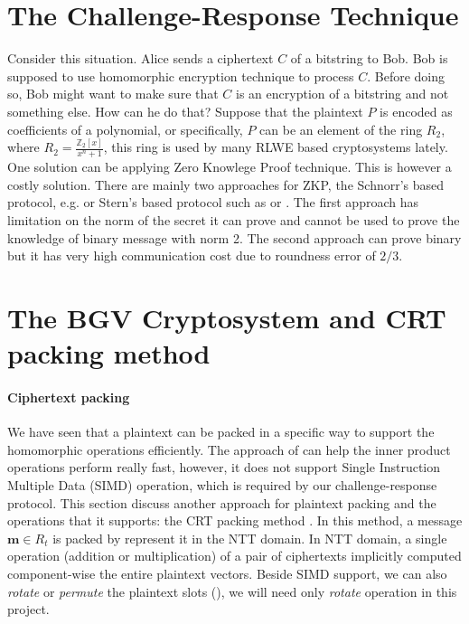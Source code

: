 \section{The Challenge-Response Technique}
\label{sec:6challenge}
Consider this situation.  Alice sends a ciphertext \(C\) of a bitstring to
Bob. Bob is supposed to use homomorphic encryption technique to process
\(C\). Before doing so, Bob might want to make sure that \(C\) is an encryption
of a bitstring and not something else. How can he do that? Suppose that the
plaintext \(P\) is encoded as coefficients of a polynomial, or specifically,
\(P\) can be an element of the ring \(R_{2}\), where
\(R_{2} = \frac{\mathbb{Z}_{2}[x]}{x^{n} + 1}\), this ring is used by many RLWE
based cryptosystems lately. One solution can be applying Zero Knowlege Proof
technique. This is however a costly solution. There are mainly two approaches
for ZKP, the Schnorr's based protocol, e.g. \cite{benhamouda2014better} or
Stern's based protocol such as \cite{stern1993new} or
\cite{ling2013improved}. The first approach has limitation on the norm of the
secret it can prove and cannot be used to prove the knowledge of binary message
with norm 2. The second approach can prove binary but it has very high
communication cost due to roundness error of \(2/3\).

\section{The BGV Cryptosystem and CRT packing method}
\label{sec:6bgv}
\paragraph{Ciphertext packing}

We have seen that a plaintext can be packed in a specific way to support the
homomorphic operations efficiently. The approach of \cite{yasuda2014practical}
can help the inner product operations perform really fast, however, it does not
support Single Instruction Multiple Data (SIMD) operation, which is required by
our challenge-response protocol. This section discuss another approach for
plaintext packing and the operations that it supports: the CRT packing method
\cite{smart2014fully}. In this method, a message \(\mathbf{m} \in R_{t}\) is
packed by represent it in the NTT domain. In NTT domain, a single operation
(addition or multiplication) of a pair of ciphertexts implicitly computed
component-wise the entire plaintext vectors. Beside SIMD support, we can also
\textit{rotate} or \textit{permute} the plaintext slots
(\cite{gentry2012fully}), we will need only \textit{rotate} operation in this
project.

